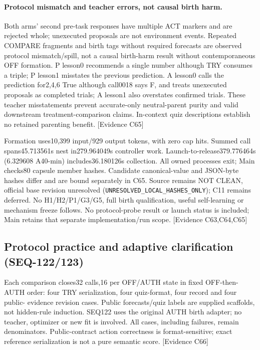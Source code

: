 \documentclass[11pt]{article}
\newcommand{\ev}[1]{\textsf{[Evidence #1]}}
\begin{document}
\paragraph{Protocol mismatch and teacher errors, not causal birth harm.}
Both arms' second pre-task responses have multiple ACT markers and are rejected
whole; unexecuted proposals are not environment events. Repeated COMPARE
fragments and birth tags without required forecasts are observed protocol
mismatch/spill, not a causal birth-harm result without contemporaneous OFF
formation. P lesson0 recommends a single number although TRY consumes a triple;
P lesson1 misstates the previous prediction. A lesson0 calls the prediction
for2,4,6 True although call0018 says F, and treats unexecuted proposals as
completed trials; A lesson1 also overstates confirmed trials. These teacher
misstatements prevent accurate-only neutral-parent purity and valid downstream
treatment-comparison claims. In-context quiz descriptions establish no retained
parenting benefit. \ev{C65}

Formation uses10{,}399 input/929 output tokens, with zero cap hits. Summed call
spans45.713561s nest in279.964049s controller work. Launch-to-release379.776464s
(6.329608 A40-min) includes36.180126s collection. All owned processes exit;
Main checks80 capsule member hashes. Candidate canonical-value and JSON-byte
hashes differ and are bound separately in C65. Source remains NOT CLEAN,
official base revision unresolved (\texttt{UNRESOLVED\_LOCAL\_HASHES\_ONLY});
C11 remains deferred. No H1/H2/P1/G3/G5, full birth qualification, useful
self-learning or mechanism freeze follows. No protocol-probe result or launch
status is included; Main retains that separate implementation/run scope.
\ev{C63,C64,C65}

\subsection{Protocol practice and adaptive clarification (SEQ-122/123)}
Each comparison closes32 calls,16 per OFF/AUTH state in fixed OFF-then-AUTH
order: four TRY serialization, four quiz-format, four record and four public-
evidence revision cases. Public forecasts/quiz labels are supplied scaffolds,
not hidden-rule induction. SEQ122 uses the original AUTH birth adapter; no
teacher, optimizer or new fit is involved. All cases, including failures, remain
denominators. Public-contract action correctness is format-sensitive; exact
reference serialization is not a pure semantic score. \ev{C66}
\end{document}
